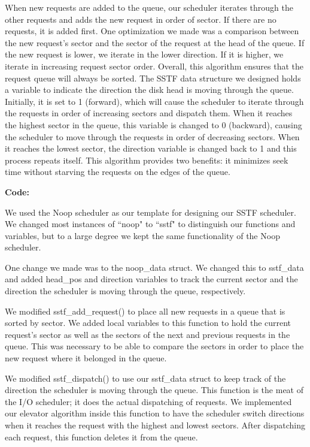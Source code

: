 \documentclass[letterpaper,10pt,titlepage]{article}
\newcommand{\tab}{\hspace*{2em}} %
\begin{document}
\begin{enumerate}
\tab When new requests are added to the queue, our scheduler iterates through the other requests and adds the new request in order of sector. If there are no requests, it is added first. One optimization we made was a comparison between the new request's sector and the sector of the request at the head of the queue. If the new request is lower, we iterate in the lower direction. If it is higher, we iterate in increasing request sector order. Overall, this algorithm ensures that the request queue will always be sorted. The SSTF data structure we designed holds a variable to indicate the direction the disk head is moving through the queue. Initially, it is set to 1 (forward), which will cause the scheduler to iterate through the requests in order of increasing sectors and dispatch them. When it reaches the highest sector in the queue, this variable is changed to 0 (backward), causing the scheduler to move through the requests in order of decreasing sectors. When it reaches the lowest sector, the direction variable is changed back to 1 and this process repeats itself. This algorithm provides two benefits: it minimizes seek time without starving the requests on the edges of the queue.

\tab \textbf{Code:}

\tab We used the Noop scheduler as our template for designing our SSTF scheduler. We changed most instances of ``noop" to ``sstf" to distinguish our functions and variables, but to a large degree we kept the same functionality of the Noop scheduler. 

\tab One change we made was to the noop\_data struct. We changed this to sstf\_data and added head\_pos and direction variables to track the current sector and the direction the scheduler is moving through the queue, respectively. 

\tab We modified sstf\_add\_request() to place all new requests in a queue that is sorted by sector. We added local variables to this function to hold the current request's sector as well as the sectors of the next and previous requests in the queue. This was necessary to be able to compare the sectors in order to place the new request where it belonged in the queue. 

\tab We modified sstf\_dispatch() to use our sstf\_data struct to keep track of the direction the scheduler is moving through the queue. This function is the meat of the I/O scheduler; it does the actual dispatching of requests. We implemented our elevator algorithm inside this function to have the scheduler switch directions when it reaches the request with the highest and lowest sectors. After dispatching each request, this function deletes it from the queue.


\end{enumerate}
\end{document}
